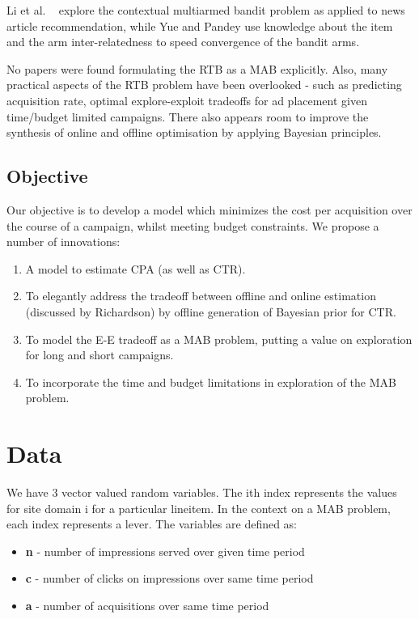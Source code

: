 \documentclass[11pt,a4,singlespacing,titlepagenumber=on]{scrreprt}
\numberwithin{equation}{chapter} %
\theoremstyle{remark}
\begin{document}
Li et al. ~\cite{Li:2010:CAP:1772690.1772758} explore the contextual multiarmed bandit problem as applied to news article recommendation, while Yue and Pandey use knowledge about the item and the arm inter-relatedness to speed convergence of the bandit arms.

No papers were found formulating the RTB as a MAB explicitly. Also, many practical aspects of the RTB problem have been overlooked - such as predicting acquisition rate, optimal explore-exploit tradeoffs for ad placement given time/budget limited campaigns. There also appears room to improve the synthesis of online and offline optimisation by applying Bayesian principles.

\section{Objective}
Our objective is to develop a model which minimizes the cost per acquisition over the course of a campaign, whilst meeting budget constraints. We propose a number of innovations:
\begin{enumerate}
	\item A model to estimate CPA (as well as CTR).
	\item To elegantly address the tradeoff between offline and online estimation (discussed by Richardson) by offline generation of Bayesian prior for CTR.
	\item To model the E-E tradeoff as a MAB problem, putting a value on exploration for long and short campaigns.
	\item To incorporate the time and budget limitations in exploration of the MAB problem.
\end{enumerate}


\chapter{Data}

We have 3 vector valued random variables. The ith index represents the values for site domain i for a particular lineitem. In the context on a MAB problem, each index represents a lever. The variables are defined as:
\begin{itemize}
	\item \textbf{n} - number of impressions served over given time period
	\item \textbf{c} - number of clicks on impressions over same time period 
	\item \textbf{a} - number of acquisitions over same time period
\end{itemize}
\end{document}
